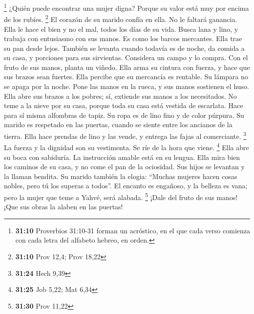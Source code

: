  \footnote{\textbf{31:10} Proverbios 31:10-31 forman un
  acróstico, en el que cada verso comienza con cada letra del alfabeto
  hebreo, en orden.} ¿Quién puede encontrar una mujer digna? Porque su
valor está muy por encima de los rubíes. \footnote{\textbf{31:10} Prov
  12,4; Prov 18,22}  El corazón de su marido confía en
ella. No le faltará ganancia.  Ella le hace el bien y no
el mal, todos los días de su vida.  Busca lana y lino, y
trabaja con entusiasmo con sus manos.  Es como los barcos
mercantes. Ella trae su pan desde lejos.  También se
levanta cuando todavía es de noche, da comida a su casa, y porciones
para sus sirvientas.  Considera un campo y lo compra. Con
el fruto de sus manos, planta un viñedo.  Ella arma su
cintura con fuerza, y hace que sus brazos sean fuertes. 
Ella percibe que su mercancía es rentable. Su lámpara no se apaga por la
noche.  Pone las manos en la rueca, y sus manos sostienen
el huso.  Ella abre sus brazos a los pobres; sí, extiende
sus manos a los necesitados.  No teme a la nieve por su
casa, porque toda su casa está vestida de escarlata. 
Hace para sí misma alfombras de tapiz. Su ropa es de lino fino y de
color púrpura.  Su marido es respetado en las puertas,
cuando se siente entre los ancianos de la tierra.  Ella
hace prendas de lino y las vende, y entrega las fajas al comerciante.
\footnote{\textbf{31:24} Hech 9,39}  La fuerza y la
dignidad son su vestimenta. Se ríe de la hora que viene. \footnote{\textbf{31:25}
  Job 5,22; Mat 6,34}  Ella abre su boca con sabiduría.
La instrucción amable está en su lengua.  Ella mira bien
los caminos de su casa, y no come el pan de la ociosidad.
 Sus hijos se levantan y la llaman bendita. Su marido
también la elogia:  ``Muchas mujeres hacen cosas nobles,
pero tú los superas a todos''.  El encanto es engañoso, y
la belleza es vana; pero la mujer que teme a Yahvé, será alabada.
\footnote{\textbf{31:30} Prov 11,22}  ¡Dale del fruto de
sus manos! ¡Que sus obras la alaben en las puertas!

